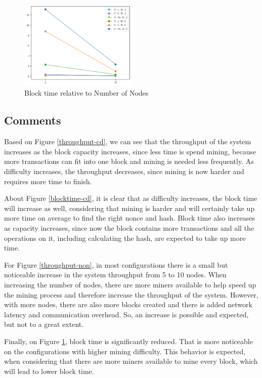 \documentclass[conference]{IEEEtran}
\begin{document}
\begin{figure}[htbp]
\centerline{\includegraphics[width=0.5\textwidth]{block-time-number-of-nodes.png}}
\caption{Block time relative to Number of Nodes}
\label{blocktime-non}
\end{figure}

\subsection{Comments}
Based on Figure \ref{throughput-cd}, we can see that the throughput of the system increases as the block capacity increases, since less time is spend mining, because more transactions can fit into one block and mining is needed less frequently. As difficulty increases, the throughput decreases, since mining is now harder and requires more time to finish.

About Figure \ref{blocktime-cd}, it is clear that as difficulty increases, the block time will increase as well, considering that mining is harder and will certainly take up more time on average to find the right nonce and hash. Block time also increases as capacity increases, since now the block contains more transactions and all the operations on it, including calculating the hash, are expected to take up more time.

For Figure \ref{throughput-non}, in most configurations there is a small but noticeable increase in the system throughput from 5 to 10 nodes. When increasing the number of nodes, there are more miners available to help speed up the mining process and therefore increase the throughput of the system. However, with more nodes, there are also more blocks created and there is added network latency and communication overhead. So, an increase is possible and expected, but not to a great extent.

Finally, on Figure \ref{blocktime-non}, block time is significantly reduced. That is more noticeable on the configurations with higher mining difficulty. This behavior is expected, when considering that there are more miners available to mine every block, which will lead to lower block time.
\end{document}

